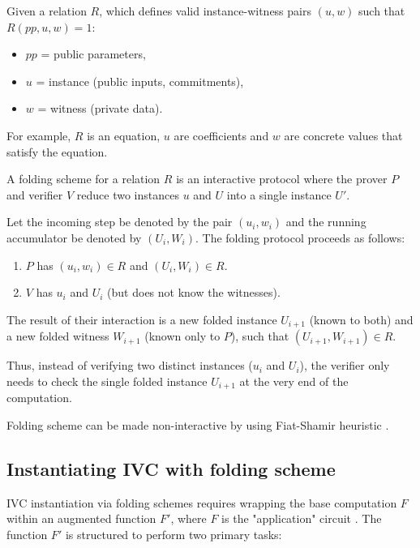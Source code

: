 Given a relation $R$, which defines valid instance-witness pairs $(u, w)$ such that $R(pp, u, w) = 1$:

\begin{itemize}
	\item $pp$ = public parameters,
	\item $u$ = instance (public inputs, commitments),
	\item $w$ = witness (private data).
\end{itemize}

For example, $R$ is an equation, $u$ are coefficients and $w$ are concrete
values that satisfy the equation.

A folding scheme for a relation $R$ is an interactive protocol where the
prover $P$ and verifier $V$ reduce two instances $u$ and $U$ into a single instance $U'$.

Let the incoming step be denoted by the pair $(u_i, w_i)$ and the running
accumulator be denoted by $(U_i, W_i)$. The folding protocol proceeds as follows:

\begin{enumerate}
	\item $P$ has $(u_i, w_i) \in R$ and $(U_i, W_i) \in R$.
	\item $V$ has $u_i$ and $U_i$ (but does not know the witnesses).
\end{enumerate}

The result of their interaction is a new folded instance $U_{i+1}$ (known to
both) and a new folded witness $W_{i+1}$ (known only to $P$), such that
$(U_{i+1}, W_{i+1}) \in R$.

Thus, instead of verifying two distinct instances ($u_i$ and $U_i$), the
verifier only needs to check the single folded instance $U_{i+1}$ at the very
end of the computation.

Folding scheme can be made non-interactive by using Fiat-Shamir heuristic \cite{FiatShamir}.

\subsection{Instantiating IVC with folding scheme}

IVC instantiation via folding schemes requires wrapping the base computation
$F$ within an augmented function $F'$, where $F$ is the "application" circuit
\cite{Nova, SuperNova, HyperNova}.
The function $F'$ is structured to perform two primary tasks:

